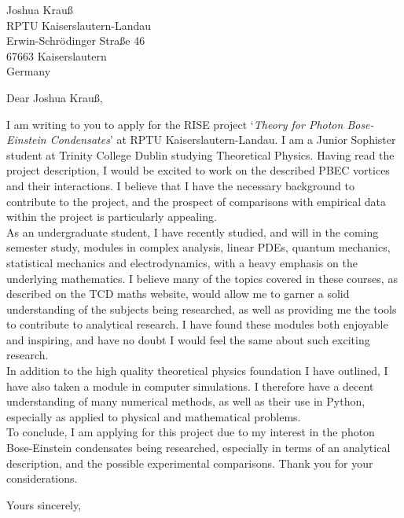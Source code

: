 \documentclass{letter}
\begin{document}
\begin{letter}{Joshua Krauß\\
    RPTU Kaiserslautern-Landau\\
    Erwin-Schrödinger Straße 46\\
    67663 Kaiserslautern \\
    Germany}

\opening{Dear Joshua Krauß,}
I am writing to you to apply for the RISE project `\textit{Theory for Photon Bose-Einstein Condensates}' at RPTU Kaiserslautern-Landau. I am a Junior Sophister student at Trinity College Dublin studying Theoretical Physics. Having read the project description, I would be excited to work on the described PBEC vortices and their interactions. I believe that I have the necessary background to contribute to the project, and the prospect of comparisons with empirical data within the project is particularly appealing.\\

As an undergraduate student, I have recently studied, and will in the coming semester study, modules in complex analysis, linear PDEs, quantum mechanics, statistical mechanics and electrodynamics, with a heavy emphasis on the underlying mathematics. I believe many of the topics covered in these courses, as described on the TCD maths website, would allow me to garner a solid understanding of the subjects being researched, as well as providing me the tools to contribute to analytical research. I have found these modules both enjoyable and inspiring, and have no doubt I would feel the same about such exciting research.\\

In addition to the high quality theoretical physics foundation I have outlined, I have also taken a module in computer simulations. I therefore have a decent understanding of many numerical methods, as well as their use in Python, especially as applied to physical and mathematical problems.\\

To conclude, I am applying for this project due to my interest in the photon Bose-Einstein condensates being researched, especially in terms of an analytical description, and the possible experimental comparisons. Thank you for your considerations.\\

\closing{Yours sincerely,}

\end{letter}
\end{document}
